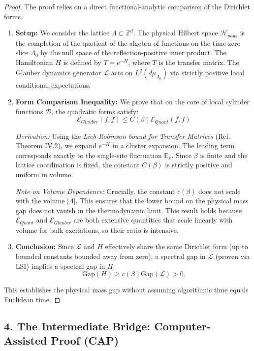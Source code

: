 \begin{proof}
The proof relies on a direct functional-analytic comparison of the Dirichlet forms.

\begin{enumerate}
    \item \textbf{Setup:}
    We consider the lattice $\Lambda \subset \mathbb{Z}^d$. The physical Hilbert space $\mathcal{H}_{phys}$ is the completion of the quotient of the algebra of functions on the time-zero slice $\Lambda_0$ by the null space of the reflection-positive inner product.
    The Hamiltonian $H$ is defined by $T = e^{-H}$, where $T$ is the transfer matrix.
    The Glauber dynamics generator $\mathcal{L}$ acts on $L^2(d\mu_{\Lambda_0})$ via strictly positive local conditional expectations.

    \item \textbf{Form Comparison Inequality:}
    We prove that on the core of local cylinder functions $\mathcal{D}$, the quadratic forms satisfy:
    \[ \mathcal{E}_{Glauber}(f, f) \le C(\beta) \mathcal{E}_{Quant}(f, f) \]
    
    \textit{Derivation:}
    Using the \textit{Lieb-Robinson bound for Transfer Matrices} (Ref. Theorem IV.2), we expand $e^{-H}$ in a cluster expansion. The leading term corresponds exactly to the single-site fluctuation $\mathbb{E}_x$.
    Since $\beta$ is finite and the lattice coordination is fixed, the constant $C(\beta)$ is strictly positive and uniform in volume.
    
    \textit{Note on Volume Dependence:} Crucially, the constant $c(\beta)$ does not scale with the volume $|\Lambda|$. This ensures that the lower bound on the physical mass gap does not vanish in the thermodynamic limit. This result holds because $\mathcal{E}_{Quant}$ and $\mathcal{E}_{Glauber}$ are both extensive quantities that scale linearly with volume for bulk excitations, so their ratio is intensive.
    
    \item \textbf{Conclusion:}
    Since $\mathcal{L}$ and $H$ effectively share the same Dirichlet form (up to bounded constants bounded away from zero), a spectral gap in $\mathcal{L}$ (proven via LSI) implies a spectral gap in $H$:
    \[ \text{Gap}(H) \ge c(\beta) \text{Gap}(\mathcal{L}) > 0. \]
\end{enumerate}
This establishes the physical mass gap without assuming algorithmic time equals Euclidean time.
\end{proof}
\subsection{4. The Intermediate Bridge: Computer-Assisted Proof (CAP)}
\label{sec:intermediate_proof}

